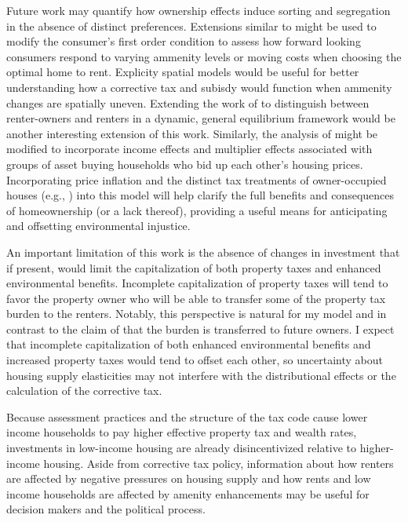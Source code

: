 \documentclass[ecta,nameyear,draft]{econsocart}
\theoremstyle{plain}
\theoremstyle{remark}
\begin{document}
Future work may quantify how ownership effects induce sorting and segregation in the absence of distinct preferences. Extensions similar to \cite{bishop19} might be used to modify the consumer's first order condition to assess how forward looking consumers respond to varying ammenity levels or moving costs when choosing the optimal home to rent. Explicity spatial models would be useful for better understanding how a corrective tax and subisdy would function when ammenity changes are spatially uneven. Extending the work of \cite{kanemoto88} to distinguish between renter-owners and renters in a dynamic, general equilibrium framework would be another interesting extension of this work. Similarly, the analysis of \cite{gervais2002} might be modified to incorporate income effects and multiplier effects associated with groups of asset buying households who bid up each other's housing prices. Incorporating price inflation and the distinct tax treatments of owner-occupied  houses (e.g., \cite{poterba84}) into this model will help clarify the full benefits and consequences of homeownership (or a lack thereof), providing a useful means for anticipating and offsetting environmental injustice.

An important limitation of this work is the absence of changes in investment that if present, would limit the capitalization of both property taxes and enhanced environmental benefits. Incomplete capitalization of property taxes will tend to favor the property owner who will be able to transfer some of the property tax burden to the renters. Notably, this perspective is natural for my model and in contrast to the claim of \cite{sirmans08} that the burden is transferred to future owners. I expect that incomplete capitalization of both enhanced environmental benefits and increased property taxes would tend to offset each other, so uncertainty about housing supply elasticities may not interfere with the distributional effects or the calculation of the corrective tax. 

Because assessment practices and the structure of the tax code cause lower income households to pay higher effective property tax and wealth rates, investments in low-income housing are already disincentivized relative to higher-income housing. Aside from corrective tax policy, information about how renters are affected by negative pressures on housing supply and how rents and low income households are affected by amenity enhancements may be useful for decision makers and the political process.
\end{document}
